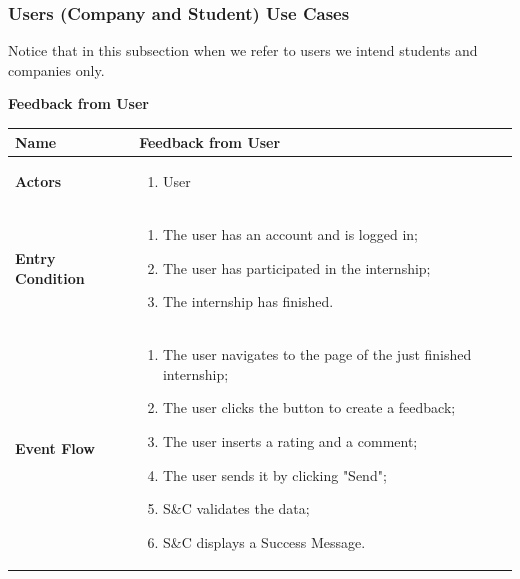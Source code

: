     \subsubsection{Users (Company and Student) Use Cases}
    Notice that in this subsection when we refer to users we intend students and companies only.
        \begin{enumerate}[label=\textbf{[US\arabic*]}, left = 0pt, align = left, resume]
            \item \textbf{Feedback from User}
            
            \begin{longtable}{|l|p{11cm}|}  
                \hline
                \textbf{Name} & 
                    \textbf{Feedback from User} \\
                \hline
                
                \textbf{Actors} & 
                    \begin{enumerate}[label=\textbullet, itemsep=0em]
                        \item User
                    \end{enumerate} \\
                \hline
                
                \textbf{Entry Condition} & 
                    \begin{enumerate}[label=\textbullet, itemsep=0em]
                        \item The user has an account and is logged in;
                        \item The user has participated in the internship;
                        \item The internship has finished.
                    \end{enumerate} \\
                \hline
                
                \textbf{Event Flow} &
                    \begin{enumerate}[label=\arabic*., itemsep=0.2em]
                        \item The user navigates to the page of the just finished internship;
                        \item The user clicks the button to create a feedback;
                        \item The user inserts a rating and a comment;
                        \item The user sends it by clicking "Send";
                        \item S\&C validates the data;
                        \item S\&C displays a Success Message.
                    \end{enumerate} \\
                \hline
                

\end{longtable}
\end{enumerate}
